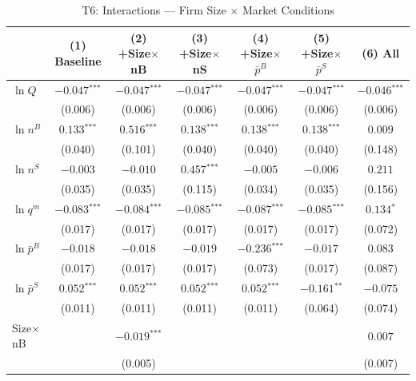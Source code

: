 \documentclass[12pt]{article}
\newcommand{\sym}[1]{\ensuremath{^{\text{#1}}}}
\newcommand{\se}[1]{{\small(#1)}}
\newcommand{\mis}{}
\begin{document}
\begin{table}[H]
  \centering
  \caption{T6: Interactions --- Firm Size \(\times\) Market Conditions}
  \label{tab:t6}
  \begin{threeparttable}
    \begin{tabular}{lcccccc}
      \toprule
      & (1) Baseline & (2) +Size\(\times\)nB & (3) +Size\(\times\)nS
        & (4) +Size\(\times\)\(\bar{p}^B\) & (5) +Size\(\times\)\(\bar{p}^S\) & (6) All \\
      \midrule
      \(\ln Q\) & \(-0.047\sym{***}\) & \(-0.047\sym{***}\) & \(-0.047\sym{***}\) & \(-0.047\sym{***}\) & \(-0.047\sym{***}\) & \(-0.046\sym{***}\) \\
                & \se{0.006} & \se{0.006} & \se{0.006} & \se{0.006} & \se{0.006} & \se{0.006} \\[4pt]
      \(\ln n^{B}\) & \(0.133\sym{***}\) & \(0.516\sym{***}\) & \(0.138\sym{***}\) & \(0.138\sym{***}\) & \(0.138\sym{***}\) & \(0.009\) \\
                    & \se{0.040} & \se{0.101} & \se{0.040} & \se{0.040} & \se{0.040} & \se{0.148} \\[4pt]
      \(\ln n^{S}\) & \(-0.003\) & \(-0.010\) & \(0.457\sym{***}\) & \(-0.005\) & \(-0.006\) & \(0.211\) \\
                    & \se{0.035} & \se{0.035} & \se{0.115} & \se{0.034} & \se{0.035} & \se{0.156} \\[4pt]
      \(\ln q^{m}\) & \(-0.083\sym{***}\) & \(-0.084\sym{***}\) & \(-0.085\sym{***}\) & \(-0.087\sym{***}\) & \(-0.085\sym{***}\) & \(0.134\sym{*}\) \\
                    & \se{0.017} & \se{0.017} & \se{0.017} & \se{0.017} & \se{0.017} & \se{0.072} \\[4pt]
      \(\ln \bar{p}^{B}\) & \(-0.018\) & \(-0.018\) & \(-0.019\) & \(-0.236\sym{***}\) & \(-0.017\) & \(0.083\) \\
                          & \se{0.017} & \se{0.017} & \se{0.017} & \se{0.073} & \se{0.017} & \se{0.087} \\[4pt]
      \(\ln \bar{p}^{S}\) & \(0.052\sym{***}\) & \(0.052\sym{***}\) & \(0.052\sym{***}\) & \(0.052\sym{***}\) & \(-0.161\sym{**}\) & \(-0.075\) \\
                          & \se{0.011} & \se{0.011} & \se{0.011} & \se{0.011} & \se{0.064} & \se{0.074} \\[4pt]
      Size\(\times\)nB & \mis & \(-0.019\sym{***}\) & \mis & \mis & \mis & \(0.007\) \\
                       &     & \se{0.005}          &     &     &     & \se{0.007} \\[4pt]

\end{tabular}
\end{threeparttable}
\end{table}
\end{document}
